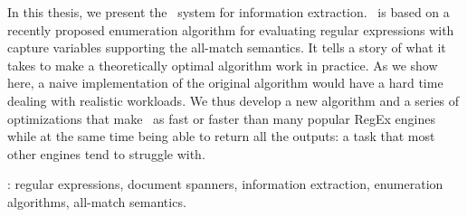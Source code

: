 In this thesis, we present the \rematch\ system for information extraction. \rematch\ is based on a recently proposed enumeration algorithm for evaluating regular expressions with capture variables supporting the all-match semantics. It tells a story of what it takes to make a theoretically optimal algorithm work in practice. As we show here, a naive implementation of the original algorithm would have a hard time dealing with realistic workloads. We thus develop a new algorithm and a series of optimizations that make \rematch\ as fast or faster than many popular RegEx engines while at the same time being able to return all the outputs: a task that most other engines tend to struggle with. \

\vfill
{}:  regular expressions, document spanners, information extraction, enumeration algorithms, all-match semantics.
